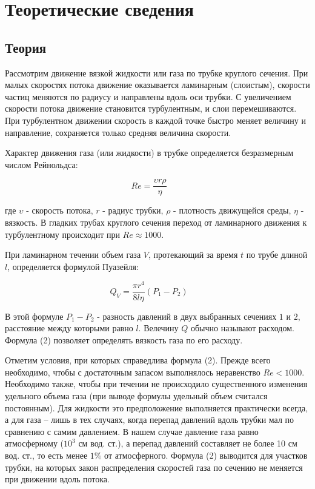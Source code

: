 \documentclass[a4paper, 12pt]{article} %
\begin{document}
\section{Теоретические сведения}

\subsection{Теория}

Рассмотрим движение вязкой жидкости или газа по трубке круглого сечения. При малых скоростях потока движение оказывается ламинарным (слоистым), скорости частиц меняются по радиусу и направлены вдоль оси трубки. С увеличением скорости потока движение становится турбулентным, и слои перемешиваются. При турбулентном движении скорость в каждой точке быстро меняет величину и направление, сохраняется только средняя величина скорости.

Характер движения газа (или жидкости) в трубке определяется безразмерным числом Рейнольдса:

\begin{equation}
	Re = \dfrac{\upsilon r \rho}{\eta} \text{  } \text{  } \text{  }
\end{equation}

где $\upsilon$ - скорость потока, $r$ - радиус трубки, $\rho$ - плотность движущейся среды, $\eta$ - вязкость. В гладких трубах круглого сечения переход от ламинарного движения к турбулентному происходит при $Re \approx 1000$.

При ламинарном течении объем газа $V$, протекающий за время $t$ по трубе длиной $l$, определяется формулой Пуазейля:

\begin{equation}
	Q_V = \dfrac{\pi r^4}{8 l \eta}(P_1 - P_2) \text{  } \text{  } \text{  }
\end{equation}

В этой формуле $P_1 - P_2$ - разность давлений в двух выбранных сечениях $1$ и $2$, расстояние между которыми равно $l$. Велечину $Q$ обычно называют расходом. Формула (2) позволяет определять вязкость газа по его расходу.

Отметим условия, при которых справедлива формула (2). Прежде всего необходимо, чтобы с достаточным запасом выполнялось неравенство $Re < 1000$. Необходимо также, чтобы при течении не происходило существенного изменения удельного объема газа (при выводе формулы удельный объем считался постоянным). Для жидкости это предположение выполняется практически всегда, а для газа -- лишь в тех случаях, когда перепад давлений вдоль трубки мал по сравнению с самим давлением. В нашем случае давление газа равно атмосферному ($10^3$ см вод. ст.), а перепад давлений составляет не более 10 см вод. ст., то есть менее $1\%$ от атмосферного. Формула (2) выводится для участков трубки, на которых закон распределения скоростей газа по сечению не меняется при движении вдоль потока.
\end{document}
